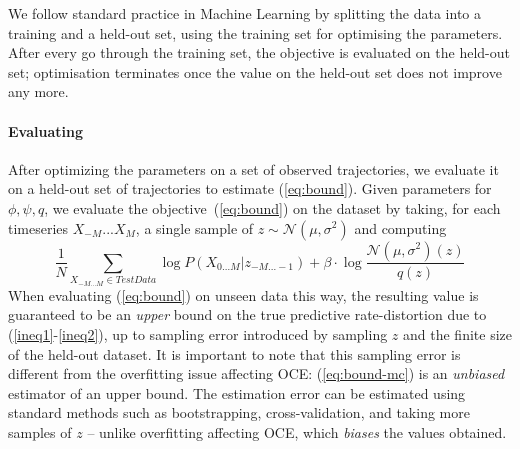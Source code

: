 \documentclass[11pt,letterpaper]{article}
\begin{document}
We follow standard practice in Machine Learning by splitting the data into a training and a held-out set, using the training set for optimising the parameters.
After every go through the training set, the objective is evaluated on the held-out set; optimisation terminates once the value on the held-out set does not improve any more.


\paragraph{Evaluating}
After optimizing the parameters on a set of observed trajectories, we evaluate it on a held-out set of trajectories to estimate (\ref{eq:bound}).
Given parameters for $\phi, \psi, q$, we evaluate the objective~(\ref{eq:bound}) on the dataset by taking, for each timeseries $X_{-M}...X_M$, a single sample of $z  \sim \mathcal{N}(\mu, \sigma^2)$ and computing
\begin{equation}\label{eq:bound-mc}
	\frac{1}{N}	\sum_{X_{-M...M} \in TestData}	\log P(X_{0\dots M} | z_{-M...-1}) + \beta \cdot \log \frac{\mathcal{N}(\mu, \sigma^2)(z)}{q(z)}
\end{equation}
When evaluating (\ref{eq:bound}) on unseen data this way, the resulting value is guaranteed to be an \emph{upper} bound on the true predictive rate-distortion due to (\ref{ineq1}-\ref{ineq2}), up to sampling error introduced by sampling $z$ and the finite size of the held-out dataset.
It is important to note that this sampling error is different from the overfitting issue affecting OCE: 
(\ref{eq:bound-mc}) is an \emph{unbiased} estimator of an upper bound.
The estimation error can be estimated using standard methods such as bootstrapping, cross-validation, and taking more samples of $z$ -- unlike overfitting affecting OCE, which \emph{biases} the values obtained.
\end{document}
